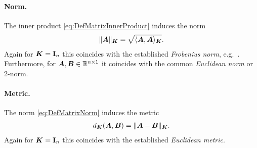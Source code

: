 \paragraph{Norm.}
The inner product \eqref{eq:DefMatrixInnerProduct} induces the norm
\begin{align}\label{eq:DefMatrixNorm}
 \norm[\mat{K}]{\mat{A}} = \sqrt{\sProd[\mat{K}]{\mat{A}}{\mat{A}}}.
\end{align}
Again for $\mat{K} = \idMat[n]$ this coincides with the established \textit{Frobenius norm}, e.g.\ \cite[p 55]{Golub:MatrixComputations}.
Furthermore, for $\mat{A}, \mat{B} \in \RealNum^{n\times 1}$ it coincides with the common \textit{Euclidean norm} or 2-norm.

\paragraph{Metric.}
The norm \eqref{eq:DefMatrixNorm} induces the metric
\begin{align}\label{eq:DefMatrixMetric}
 d_{\mat{K}}(\mat{A}, \mat{B}) = \norm[\mat{K}]{\mat{A}-\mat{B}}.
\end{align}
Again for $\mat{K} = \idMat[n]$ this coincides with the established \textit{Euclidean metric}.

